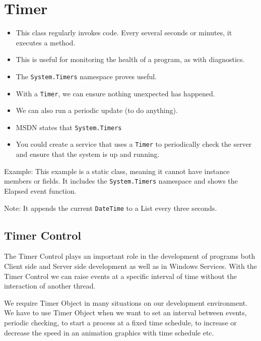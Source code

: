 \section{Timer}
\begin{itemize}
	\item This class regularly invokes code. Every several seconds or minutes, it executes a method. 
	\item This is useful for monitoring the health of a program, as with diagnostics. 
	\item The \texttt{System.Timers} namespace proves useful. 
	\item With a \texttt{Timer}, we can ensure nothing unexpected has happened. 
	\item We can also run a	periodic update (to do anything). 
	\item MSDN states that \texttt{System.Timers}  
	\item You could create a service that uses a \texttt{Timer} to periodically check the server and ensure that the system is up and
	running.
\end{itemize}


Example: This example is a static class, meaning it cannot have instance members or fields. It includes the \texttt{System.Timers} namespace and shows the Elapsed event function.

Note: It appends the current \texttt{DateTime} to a List every three seconds.






\subsection*{Timer Control}
The Timer Control plays an important role in the development of programs both Client side and Server side development as well as in Windows Services. With the Timer Control we can raise events at a specific interval of time without the interaction of another thread.

We require Timer Object in many situations on our development environment. We have to use Timer Object when we want to set an interval between events, periodic checking, to start a process at a fixed time schedule, to increase or decrease the speed in an animation graphics with time schedule etc.

